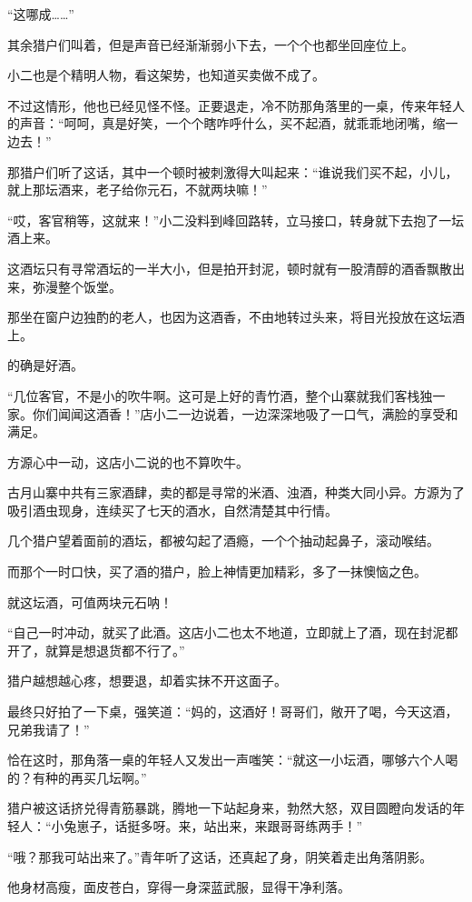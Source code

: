 \begin{this_body}
“这哪成……”

其余猎户们叫着，但是声音已经渐渐弱小下去，一个个也都坐回座位上。

小二也是个精明人物，看这架势，也知道买卖做不成了。

不过这情形，他也已经见怪不怪。正要退走，冷不防那角落里的一桌，传来年轻人的声音：“呵呵，真是好笑，一个个瞎咋呼什么，买不起酒，就乖乖地闭嘴，缩一边去！”

那猎户们听了这话，其中一个顿时被刺激得大叫起来：“谁说我们买不起，小儿，就上那坛酒来，老子给你元石，不就两块嘛！”

“哎，客官稍等，这就来！”小二没料到峰回路转，立马接口，转身就下去抱了一坛酒上来。

这酒坛只有寻常酒坛的一半大小，但是拍开封泥，顿时就有一股清醇的酒香飘散出来，弥漫整个饭堂。

那坐在窗户边独酌的老人，也因为这酒香，不由地转过头来，将目光投放在这坛酒上。

的确是好酒。

“几位客官，不是小的吹牛啊。这可是上好的青竹酒，整个山寨就我们客栈独一家。你们闻闻这酒香！”店小二一边说着，一边深深地吸了一口气，满脸的享受和满足。

方源心中一动，这店小二说的也不算吹牛。

古月山寨中共有三家酒肆，卖的都是寻常的米酒、浊酒，种类大同小异。方源为了吸引酒虫现身，连续买了七天的酒水，自然清楚其中行情。

几个猎户望着面前的酒坛，都被勾起了酒瘾，一个个抽动起鼻子，滚动喉结。

而那个一时口快，买了酒的猎户，脸上神情更加精彩，多了一抹懊恼之色。

就这坛酒，可值两块元石呐！

“自己一时冲动，就买了此酒。这店小二也太不地道，立即就上了酒，现在封泥都开了，就算是想退货都不行了。”

猎户越想越心疼，想要退，却着实抹不开这面子。

最终只好拍了一下桌，强笑道：“妈的，这酒好！哥哥们，敞开了喝，今天这酒，兄弟我请了！”

恰在这时，那角落一桌的年轻人又发出一声嗤笑：“就这一小坛酒，哪够六个人喝的？有种的再买几坛啊。”

猎户被这话挤兑得青筋暴跳，腾地一下站起身来，勃然大怒，双目圆瞪向发话的年轻人：“小兔崽子，话挺多呀。来，站出来，来跟哥哥练两手！”

“哦？那我可站出来了。”青年听了这话，还真起了身，阴笑着走出角落阴影。

他身材高瘦，面皮苍白，穿得一身深蓝武服，显得干净利落。


\end{this_body}
